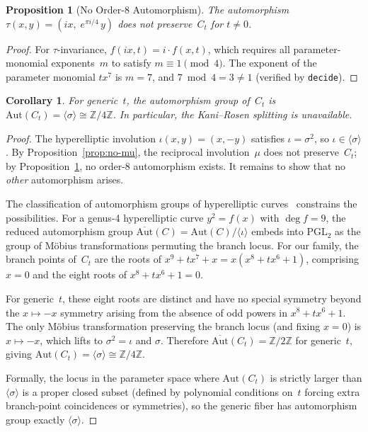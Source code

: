 \documentclass[11pt]{article}
\theoremstyle{plain}
\newtheorem{proposition}[theorem]{Proposition}
\newtheorem{corollary}[theorem]{Corollary}
\theoremstyle{definition}
\theoremstyle{remark}
\newcommand{\Z}{\mathbb{Z}}
\begin{document}
\begin{proposition}[No Order-8 Automorphism]\label{prop:no-tau}
The automorphism $\tau(x,y) = (ix,\; e^{\pi i/4}\, y)$ does not
preserve~$C_t$ for $t \neq 0$.
\end{proposition}

\begin{proof}
For $\tau$-invariance, $f(ix, t) = i \cdot f(x,t)$, which requires
all parameter-monomial exponents~$m$ to satisfy
$m \equiv 1 \pmod{4}$.  The exponent of the parameter monomial
$tx^7$ is $m = 7$, and $7 \bmod 4 = 3 \neq 1$
(verified by \texttt{decide}).
\end{proof}

\begin{corollary}\label{cor:aut}
For generic~$t$, the automorphism group of~$C_t$ is
$\mathrm{Aut}(C_t) = \langle\sigma\rangle \cong \Z/4\Z$.
In particular, the Kani--Rosen splitting is unavailable.
\end{corollary}

\begin{proof}
The hyperelliptic involution $\iota(x,y) = (x,-y)$ satisfies
$\iota = \sigma^2$, so $\iota \in \langle\sigma\rangle$.
By Proposition~\ref{prop:no-mu}, the reciprocal involution~$\mu$
does not preserve~$C_t$; by Proposition~\ref{prop:no-tau}, no
order-8 automorphism exists.  It remains to show that no
\emph{other} automorphism arises.

The classification of automorphism groups of hyperelliptic
curves~\cite{ShaTh03,BuCo05} constrains the possibilities.
For a genus-4 hyperelliptic curve $y^2 = f(x)$ with
$\deg f = 9$, the reduced automorphism group
$\overline{\mathrm{Aut}}(C) = \mathrm{Aut}(C)/\langle\iota\rangle$
embeds into $\mathrm{PGL}_2$ as the group of M\"obius transformations
permuting the branch locus.  For our family, the branch points
of~$C_t$ are the roots of $x^9 + tx^7 + x = x(x^8 + tx^6 + 1)$,
comprising $x = 0$ and the eight roots of $x^8 + tx^6 + 1 = 0$.

For generic~$t$, these eight roots are distinct and have no
special symmetry beyond the $x \mapsto -x$ symmetry arising from
the absence of odd powers in $x^8 + tx^6 + 1$.  The only
M\"obius transformation preserving the branch locus (and fixing
$x = 0$) is $x \mapsto -x$, which lifts to
$\sigma^2 = \iota$ and $\sigma$.  Therefore
$\overline{\mathrm{Aut}}(C_t) = \Z/2\Z$ for generic~$t$,
giving $\mathrm{Aut}(C_t) = \langle\sigma\rangle \cong \Z/4\Z$.

Formally, the locus in the parameter space where
$\mathrm{Aut}(C_t)$ is strictly larger than $\langle\sigma\rangle$
is a proper closed subset (defined by polynomial conditions on~$t$
forcing extra branch-point coincidences or symmetries), so
the generic fiber has automorphism group exactly
$\langle\sigma\rangle$.
\end{proof}
\end{document}
